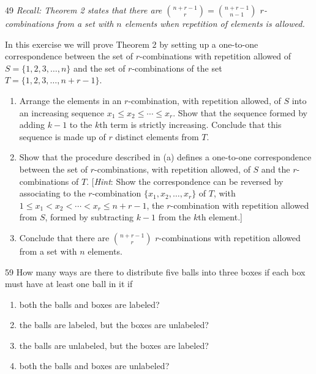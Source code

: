 \documentclass[11pt]{article}
\begin{document}
\begin{exercise}{49}
    \textit{Recall: Theorem 2 states that there are
    $\binom{n+r-1}{r} = \binom{n+r-1}{n-1}$ $r$-combinations from a
    set with $n$ elements when repetition of elements is allowed.}

    In this exercise we will prove Theorem 2 by setting up a
    one-to-one correspondence between the set of $r$-combinations
    with repetition allowed of $S = \{1, 2, 3, \dots, n\}$ and the
    set of $r$-combinations of the set $T = \{1, 2, 3, \dots,
    n+r-1\}$.
    \begin{enumerate}[label=(\alph*)]
        \item Arrange the elements in an $r$-combination, with
        repetition allowed, of $S$ into an increasing sequence
        $x_1 \leq x_2 \leq \cdots \leq x_r$. Show that the sequence
        formed by adding $k-1$ to the $k$th term is strictly
        increasing. Conclude that this sequence is made up of $r$
        distinct elements from $T$.
        \item Show that the procedure described in (a) defines a
        one-to-one correspondence between the set of
        $r$-combinations, with repetition allowed, of $S$ and the
        $r$-combinations of $T$.
        [\emph{Hint}: Show the correspondence can be reversed by
        associating to the $r$-combination $\{x_1, x_2, \dots, x_r\}$
        of $T$, with $1 \leq x_1 < x_2 < \cdots < x_r \leq n+r-1$,
        the $r$-combination with repetition allowed from $S$, formed
        by subtracting $k-1$ from the $k$th element.]
        \item Conclude that there are $\binom{n+r-1}{r}$
        $r$-combinations with repetition allowed from a set with $n$
        elements.
    \end{enumerate}
\end{exercise}

\begin{exercise}{59}
    How many ways are there to distribute five balls into three boxes
    if each box must have at least one ball in it if
    \begin{enumerate}[label=(\alph*)]
        \item both the balls and boxes are labeled?
        \item the balls are labeled, but the boxes are unlabeled?
        \item the balls are unlabeled, but the boxes are labeled?
        \item both the balls and boxes are unlabeled?
    \end{enumerate}
\end{exercise}
\end{document}
